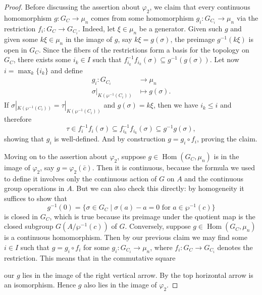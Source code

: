 \documentclass[12pt]{amsart}
\DeclareMathOperator{\Hom}{Hom}
\begin{document}
\begin{prop}
\begin{proof}
	Before discussing the assertion about $\varphi_{2}$, we claim that every continuous homomorphism $g\colon G_{C}\to \mu_{n}$ comes from some homomorphism $g_{i}\colon G_{C_{i}}\to \mu_{n}$ via the restriction $f_{i}\colon G_{C}\to G_{C_{i}}$.
	Indeed, let $\xi\in \mu_{n}$ be a generator.
	Given such $g$ and given some $k\xi\in \mu_{n}$ in the image of $g$, say $k\xi=g(\sigma)$, the preimage $g^{-1}(k\xi)$ is open in $G_{C}$.
	Since the fibers of the restrictions form a basis for the topology on $G_{C}$, there exists some $i_{k}\in I$ such that $f_{i_{k}}^{-1}f_{i_{k}}(\sigma)\subseteq g^{-1}(g(\sigma))$.
	Let now $i=\max_{k}\{ i_{k} \}$ and define
	\begin{align*}
	    g_{i}\colon G_{C_{i}} & \longrightarrow \mu_{n} \\
	    \sigma|_{K(\wp^{-1}(C_{i}))} & \longmapsto g(\sigma).
	\end{align*}
	If $\sigma|_{K(\wp^{-1}(C_{i}))}=\tau|_{K(\wp^{-1}(C_{i}))}$ and $g(\sigma)=k\xi$, then we have $i_{k}\leqslant i$ and therefore
	\[ \tau\in f_{i}^{-1}f_{i}(\sigma)\subseteq f_{i_{k}}^{-1}f_{i_{k}}(\sigma)\subseteq g^{-1}g(\sigma), \]
	showing that $g_{i}$ is well-defined.
	And by construction $g=g_{i}\circ f_{i}$, proving the claim.

	Moving on to the assertion about $\varphi_{2}$, suppose $g\in \Hom(G_{C},\mu_{n})$ is in the image of $\varphi_{2}$, say $g=\varphi_{2}(\bar{c})$.
	Then it is continuous, because the formula we used to define it involves only the continuous action of $G$ on $A$ and the continuous group operations in $A$.
	But we can also check this directly: by homogeneity it suffices to show that
	\[ g^{-1}(0)=\{ \sigma\in G_{C}\mid \sigma(a)-a=0 \text{ for }a\in \wp^{-1}(c) \} \]
	is closed in $G_{C}$, which is true because its preimage under the quotient map is the closed subgroup $G(A/\wp^{-1}(c))$ of $G$.
	Conversely, suppose $g\in \Hom(G_{C},\mu_{n})$ is a continuous homomorphism.
	Then by our previous claim we may find some $i\in I$ such that $g=g_{i}\circ f_{i}$ for some $g_{i}\colon G_{C_{i}}\to \mu_{n}$, where $f_{i}\colon G_{C}\to G_{C_{i}}$ denotes the restriction.
	This means that in the commutative square
	\begin{center}
	\end{center}
	our $g$ lies in the image of the right vertical arrow.
	By  the top horizontal arrow is an isomorphism.
	Hence $g$ also lies in the image of $\varphi_{2}$.
    \end{proof}
\end{prop}

\newpage


\vfill
\end{document}

